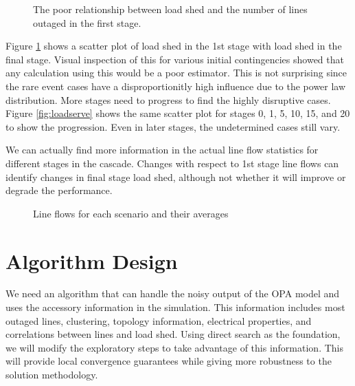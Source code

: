 \begin{figure}
\centering

\caption{The poor relationship between load shed and the number of lines outaged in the first stage.}
\label{fig:first}
\end{figure}

Figure \ref{fig:first} shows a scatter plot of load shed in the 1st stage with load shed in the final stage.
\endnote{}
Visual inspection of this for various initial contingencies showed that any calculation using this would be a poor estimator.  This is not surprising since the rare event cases have a disproportionitly high influence due to the power law distribution.  More stages need to progress to find the highly disruptive cases.  Figure \ref{fig:loadserve} shows the same scatter plot for stages 0, 1, 5, 10, 15, and 20 to show the progression.  Even in later stages, the undetermined cases still vary.

We can actually find more information in the actual line flow statistics for different stages in the cascade.  Changes with respect to 1st stage line flows can identify changes in final stage load shed, although not whether it will improve or degrade the performance.
\begin{figure}
\centering

%
 \caption{Line flows for each scenario and  their averages}
\label{fig:flows}
\end{figure}
\endnote{}



\section{Algorithm Design}
We need an algorithm that can handle the noisy output of the OPA model and uses the accessory information in the simulation.  This information includes most outaged lines, clustering, topology information, electrical properties, and correlations between lines and load shed. Using direct search as the foundation, we will modify the exploratory steps to take advantage of this information.  This will provide local convergence guarantees while giving more robustness to the solution methodology.


